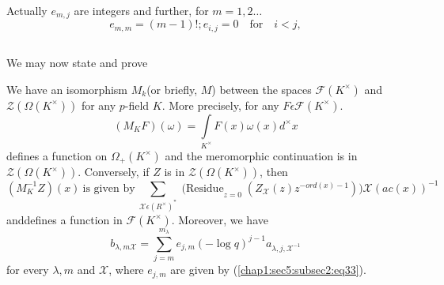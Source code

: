 Actually $e_{m,j}$ are integers and further, for $m=1,2\ldots$
\begin{equation*}
  e_{m,m}=(m-1)!;e_{i,j}=0\quad\text{for}\quad
  i<j,\tag{34}\label{chap1:sec5:subsec2:eq34} 
\end{equation*}

\subsection{}\label{chap1:sec5:subsec3} %

We may now state and prove
\setcounter{theorem}{2}
\begin{theorem}\label{chap1:sec5:subsec3:thm3} %
  We have an isomorphism $M_{k}$(or briefly, $M$) between the spaces
  $\mathscr{F}(K^\times)$ and $\mathscr{Z}(\Omega(K^\times))$ for any
  $p$-field $K$. More precisely, for any $F\epsilon
  \mathscr{F}(K^\times )$.
  \begin{equation*}
    (M_{K}F)(\omega)=\int\limits_{K^\times }F(x)\omega(x)d^\times x
  \end{equation*}
  defines a function on $\Omega_{+}(K^\times )$ and the meromorphic
  continuation is in $\mathscr{Z}(\Omega(K^\times ))$. Conversely, if $Z$
  is in $\mathscr{Z}(\Omega(K^\times ))$, then
  \begin{equation*}
    (M_{K}^{-1}Z)(x)~\text{is given by}~ \sum\limits_{\mathcal{X}
      \epsilon(R^\times )^{\ast}}
    {\displaystyle{\mathop{(\text{Residue}}}}_{z=0}
    (Z_{\mathcal{X}}(z)z^{-ord(x)-1}))
    \mathcal{X}(ac(x))^{-1}\tag{35}\label{chap1:sec5:subsec3:eq35} 
  \end{equation*}
  and\pageoriginale defines a function in $\mathscr{F}(K^\times )$. Moreover, we have
  \begin{equation*}
    b_{\lambda,m \mathcal{X}} = \sum\limits_{j=m}^{m_{\lambda}}
    e_{j,m}(-\log q)^{j-1}
    a_{\lambda,j,\mathcal{X}^{-1}}\tag{36} \label{chap1:sec5:subsec3:eq36} 
  \end{equation*}
  for every $\lambda,m $ and $\mathcal{X}$, where $e_{j,m}$ are given
  by (\ref{chap1:sec5:subsec2:eq33}).
\end{theorem}

